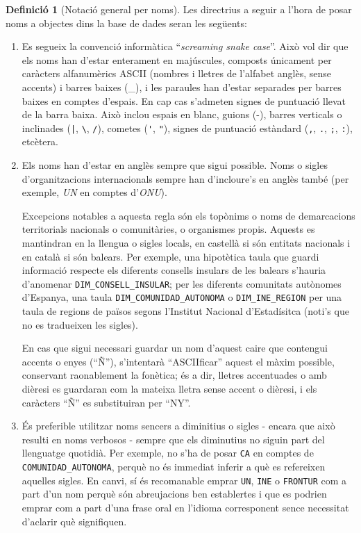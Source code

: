 \documentclass{article}
\theoremstyle{definition}
\newtheorem{definition}{Definició}
\begin{document}
\begin{definition}[Notació general per noms]\label{def:general:notation}
Les directrius a seguir a l'hora de posar noms a objectes dins la base de dades seran les següents:
\begin{enumerate}
  \item Es segueix la convenció informàtica ``\emph{screaming snake case}''. Això vol dir que els noms han d'estar enterament en majúscules, composts únicament per caràcters alfanumèrics ASCII (nombres i lletres de l'alfabet anglès, sense accents) i barres baixes (\_), i les paraules han d'estar separades per barres baixes en comptes d'espais. En cap cas s'admeten signes de puntuació llevat de la barra baixa. Això inclou espais en blanc, guions (-), barres verticals o inclinades (\verb'|', \verb|\|, \verb|/|), cometes (\verb|'|, \verb|"|), signes de puntuació estàndard (\verb|,|, \verb|.|, \verb|;|, \verb|:|), etcètera.

  \item Els noms han d'estar en anglès sempre que sigui possible. Noms o sigles d'organitzacions internacionals sempre han d'incloure's en anglès també (per exemple, \emph{UN} en comptes d'\emph{ONU}).

  Excepcions notables a aquesta regla són els topònims o noms de demarcacions territorials nacionals o comunitàries, o organismes propis. Aquests es mantindran en la llengua o sigles locals, en castellà si són entitats nacionals i en català si són balears. Per exemple, una hipotètica taula que guardi informació respecte els diferents consells insulars de les balears s'hauria d'anomenar \verb|DIM_CONSELL_INSULAR|; per les diferents comunitats autònomes d'Espanya, una taula \verb|DIM_COMUNIDAD_AUTONOMA| o \verb|DIM_INE_REGION| per una taula de regions de països segons l'Institut Nacional d'Estadísitca (noti's que no es tradueixen les sigles).

  En cas que sigui necessari guardar un nom d'aquest caire que contengui accents o enyes (``Ñ''), s'intentarà ``ASCIIficar'' aquest el màxim possible, conservant raonablement la fonètica; és a dir, lletres accentuades o amb dièresi es guardaran com la mateixa lletra sense accent o dièresi, i els caràcters ``Ñ'' es substituiran per ``NY''.

  \item És preferible utilitzar noms sencers a diminitius o sigles - encara que això resulti en noms verbosos - sempre que els diminutius no siguin part del llenguatge quotidià. Per exemple, no s'ha de posar \verb|CA| en comptes de \verb|COMUNIDAD_AUTONOMA|, perquè no és immediat inferir a què es refereixen aquelles sigles. En canvi, sí és recomanable emprar \verb|UN|, \verb|INE| o \verb|FRONTUR| com a part d'un nom perquè són abreujacions ben establertes i que es podrien emprar com a part d'una frase oral en l'idioma corresponent sence necessitat d'aclarir què signifiquen.
\end{enumerate}
\end{definition}
\end{document}
